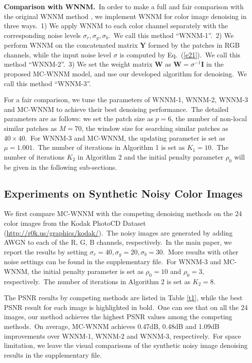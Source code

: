 \textbf{Comparison with WNNM.}\
In order to make a full and fair comparison with the original WNNM method \cite{wnnmijcv}, we implement WNNM for color image denoising in three ways.\ 
1) We apply WNNM to each color channel separately with the corresponding noise levels $\sigma_{r}, \sigma_{g}, \sigma_{b}$.\ We call this method ``WNNM-1''.\
2) We perform WNNM on the concatenated matrix $\mathbf{Y}$ formed by the patches in RGB channels, while the input noise level $\sigma$ is computed by Eq.\ (\ref{e21}).\ We call this method ``WNNM-2''.\
3) We set the weight matrix $\mathbf{W}$ as $\mathbf{W}=\sigma^{-1}\mathbf{I}$ in the proposed MC-WNNM model, and use our developed algorithm for denoising.\ We call this method ``WNNM-3''.

For a fair comparison, we tune the parameters of WNNM-1, WNNM-2, WNNM-3 and MC-WNNM to achieve their best denoising performance.\ The detailed parameters are as follows: we set the patch size as $p = 6$, the number of non-local similar patches as $M = 70$, the window size for searching similar patches as $40\times40$.\ For WNNM-3 and MC-WNNM, the updating parameter is set as $\mu=1.001$.\ The number of iterations in Algorithm 1 is set as $K_{1} = 10$.\ The number of iterations $K_{2}$ in Algorithm 2 and the initial penalty parameter $\rho_{0}$ will be given in the following sub-sections.



\subsection{Experiments on Synthetic Noisy Color Images}

We first compare MC-WNNM with the competing denoising methods \cite{cbm3d,mlp,chen2015learning,dncnn,noiseclinic,neatimage} on the 24 color images from the Kodak PhotoCD Dataset (\url{http://r0k.us/graphics/kodak/}).\ The noisy images are generated by adding AWGN to each of the R, G, B channels, respectively.\ In the main paper, we report the results by setting $\sigma_{r}=40, \sigma_{g}=20, \sigma_{b}=30$.\ More results with other noise settings can be found in the supplementary file.\ For WNNM-3 and MC-WNNM, the initial penalty parameter is set as $\rho_{0}=10$ and $\rho_{0}=3$, respectively.\ The number of iterations in Algorithm 2 is set as $K_{2}=8$. 

The PSNR results by competing methods are listed in Table \ref{t1}, while the best PSNR result for each image is highlighted in bold.\ One can see that on all the 24 images, our method achieves the highest PSNR values among the competing methods.\ On average, MC-WNNM achieves 0.47dB, 0.48dB and 1.09dB improvements over WNNM-1, WNNM-2 and WNNM-3, respectively.\ For space limitation, we leave the visual comparisons of the synthetic noisy image denoising results in the supplementary file.

